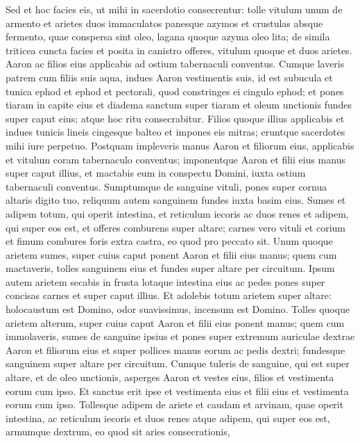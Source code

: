 \begin{biblechapter}  
\verse Sed et hoc facies eis, ut mihi in sacerdotio consecrentur: tolle vitulum unum de armento et arietes duos immaculatos 
\verse panesque azymos et crustulas absque fermento, quae conspersa sint oleo, lagana quoque azyma oleo lita; de simila triticea cuncta facies 
\verse et posita in canistro offeres, vitulum quoque et duos arietes. 
\verse Aaron ac filios eius applicabis ad ostium tabernaculi conventus. Cumque laveris patrem cum filiis suis aqua, 
\verse indues Aaron vestimentis suis, id est subucula et tunica ephod et ephod et pectorali, quod constringes ei cingulo ephod; 
\verse et pones tiaram in capite eius et diadema sanctum super tiaram 
\verse et oleum unctionis fundes super caput eius; atque hoc ritu consecrabitur. 
\verse Filios quoque illius applicabis et indues tunicis lineis cingesque balteo 
\verse et impones eis mitras; eruntque sacerdotes mihi iure perpetuo. Postquam impleveris manus Aaron et filiorum eius, 
\verse applicabis et vitulum coram tabernaculo conventus; imponentque Aaron et filii eius manus super caput illius, 
\verse et mactabis eum in conspectu Domini, iuxta ostium tabernaculi conventus.  
\verse Sumptumque de sanguine vituli, pones super cornua altaris digito tuo, reliquum autem sanguinem fundes iuxta basim eius. 
\verse Sumes et adipem totum, qui operit intestina, et reticulum iecoris ac duos renes et adipem, qui super eos est, et offeres comburens super altare; 
\verse carnes vero vituli et corium et fimum combures foris extra castra, eo quod pro peccato sit. 
\verse Unum quoque arietem sumes, super cuius caput ponent Aaron et filii eius manus; 
\verse quem cum mactaveris, tolles sanguinem eius et fundes super altare per circuitum. 
\verse Ipsum autem arietem secabis in frusta lotaque intestina eius ac pedes pones super concisas carnes et super caput illius. 
\verse Et adolebis totum arietem super altare: holocaustum est Domino, odor suavissimus, incensum est Domino. 
\verse Tolles quoque arietem alterum, super cuius caput Aaron et filii eius ponent manus; 
\verse quem cum immolaveris, sumes de sanguine ipsius et pones super extremum auriculae dextrae Aaron et filiorum eius et super pollices manus eorum ac pedis dextri; fundesque sanguinem super altare per circuitum. 
\verse Cumque tuleris de sanguine, qui est super altare, et de oleo unctionis, asperges Aaron et vestes eius, filios et vestimenta eorum cum ipso. Et sanctus erit ipse et vestimenta eius et filii eius et vestimenta eorum cum ipso. 
\verse Tollesque adipem de ariete et caudam et arvinam, quae operit intestina, ac reticulum iecoris et duos renes atque adipem, qui super eos est, armumque dextrum, eo quod sit aries consecrationis, 

\end{biblechapter}

